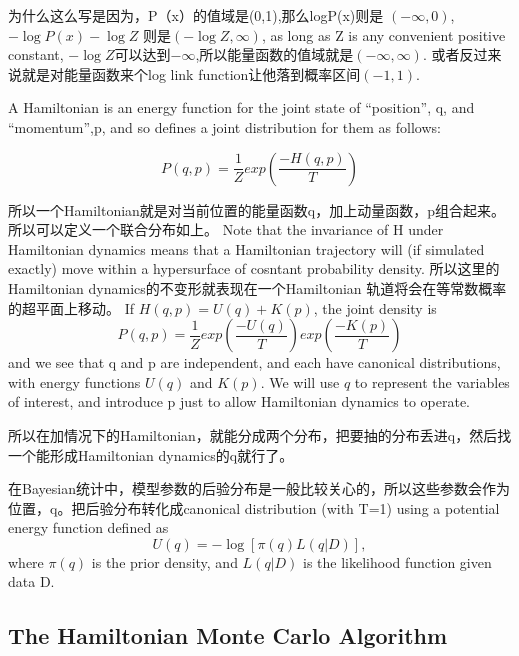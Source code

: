 \documentclass[
]{book}
\theoremstyle{definition}
\theoremstyle{definition}
\theoremstyle{definition}
\theoremstyle{remark}
\begin{document}
为什么这么写是因为，P（x）的值域是(0,1),那么logP(x)则是 \((-\infty,0)\),
\(-\log P(x)-\log Z\) 则是\((-\log Z,\infty)\), as long as Z is any convenient positive constant, \(-\log Z\)可以达到\(-\infty\),所以能量函数的值域就是\((-\infty,\infty)\). 或者反过来说就是对能量函数来个log link function让他落到概率区间\((-1,1)\).

A Hamiltonian is an energy function for the joint state of ``position'', q, and ``momentum'',p, and so defines a joint distribution for them as follows:

\[
P(q,p)=\frac{1}{Z}exp(\frac{-H(q,p)}{T})
\]

所以一个Hamiltonian就是对当前位置的能量函数q，加上动量函数，p组合起来。所以可以定义一个联合分布如上。
Note that the invariance of H under Hamiltonian dynamics means that a Hamiltonian trajectory will (if simulated exactly) move within a hypersurface of cosntant probability density.
所以这里的Hamiltonian dynamics的不变形就表现在一个Hamiltonian 轨道将会在等常数概率的超平面上移动。
If \(H(q,p)=U(q)+K(p)\), the joint density is
\[
P(q,p)=\frac{1}{Z}exp(\frac{-U(q)}{T})exp(\frac{-K(p)}{T})
\]
and we see that q and p are independent, and each have canonical distributions, with energy functions \(U(q)\) and \(K(p)\). We will use \(q\) to represent the variables of interest, and introduce p just to allow Hamiltonian dynamics to operate.

所以在加情况下的Hamiltonian，就能分成两个分布，把要抽的分布丢进q，然后找一个能形成Hamiltonian dynamics的q就行了。

在Bayesian统计中，模型参数的后验分布是一般比较关心的，所以这些参数会作为位置，q。把后验分布转化成canonical distribution (with T=1) using a potential energy function defined as
\[
U(q)=-\log [\pi(q) L(q | D)],
\]
where \(\pi(q)\) is the prior density, and \(L(q|D)\) is the likelihood function given data D.

\hypertarget{the-hamiltonian-monte-carlo-algorithm}{%
\subsection{The Hamiltonian Monte Carlo Algorithm}\label{the-hamiltonian-monte-carlo-algorithm}}
\end{document}
